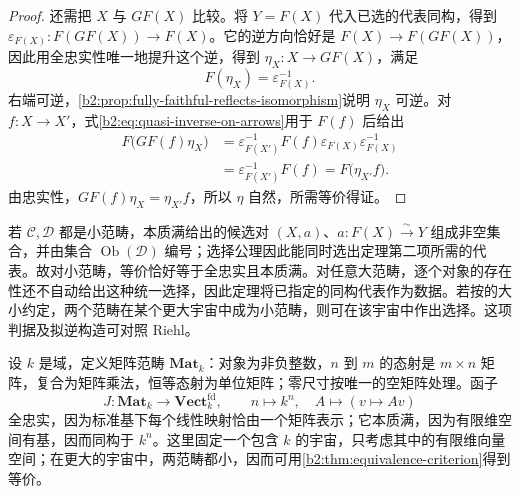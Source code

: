 \begin{proof}
	还需把 \(X\) 与 \(GF(X)\) 比较。将 \(Y=F(X)\) 代入已选的代表同构，得到 \(\varepsilon_{F(X)}:F(GF(X))\rightarrow F(X)\)。它的逆方向恰好是 \(F(X)\rightarrow F(GF(X))\)，因此用全忠实性唯一地提升这个逆，得到 \(\eta_X:X\rightarrow GF(X)\)，满足
	\[
		F(\eta_X)=\varepsilon_{F(X)}^{-1}.
	\]
	右端可逆，\cref{b2:prop:fully-faithful-reflects-isomorphism}说明 \(\eta_X\) 可逆。对 \(f:X\rightarrow X'\)，式\eqref{b2:eq:quasi-inverse-on-arrows}用于 \(F(f)\) 后给出
	\[
		\begin{aligned}
			F\bigl(GF(f)\eta_X\bigr) &=\varepsilon_{F(X')}^{-1}F(f)\varepsilon_{F(X)}\varepsilon_{F(X)}^{-1}\\
			&=\varepsilon_{F(X')}^{-1}F(f) =F\bigl(\eta_{X'}f\bigr).
		\end{aligned}
	\]
	由忠实性，\(GF(f)\eta_X=\eta_{X'}f\)，所以 \(\eta\) 自然，所需等价得证。

\end{proof}

若 \(\mathcal C,\mathcal D\) 都是小范畴，本质满给出的候选对 \((X,a)\)、\(a:F(X)\xrightarrow{\sim}Y\) 组成非空集合，并由集合 \(\operatorname{Ob}(\mathcal D)\) 编号；选择公理因此能同时选出定理第二项所需的代表。故对小范畴，等价恰好等于全忠实且本质满。对任意大范畴，逐个对象的存在性还不自动给出这种统一选择，因此定理将已指定的同构代表作为数据。若按的大小约定，两个范畴在某个更大宇宙中成为小范畴，则可在该宇宙中作出选择。这项判据及拟逆构造可对照 Riehl\cite[Theorem 1.5.9, pp. 31--32]{Riehl2016CategoryTheory}。

\ProseParagraphBreak
设 \(k\) 是域，定义矩阵范畴 \(\mathbf{Mat}_k\)：对象为非负整数，\(n\) 到 \(m\) 的态射是 \(m\times n\) 矩阵，复合为矩阵乘法，恒等态射为单位矩阵；零尺寸按唯一的空矩阵处理。函子
\[
	J:\mathbf{Mat}_k\longrightarrow\mathbf{Vect}_k^{\mathrm{fd}},\qquad n\longmapsto k^n,\quad A\longmapsto(v\mapsto Av)
\]
全忠实，因为标准基下每个线性映射恰由一个矩阵表示；它本质满，因为有限维空间有基，因而同构于 \(k^n\)。这里固定一个包含 \(k\) 的宇宙，只考虑其中的有限维向量空间；在更大的宇宙中，两范畴都小，因而可用\cref{b2:thm:equivalence-criterion}得到等价。

